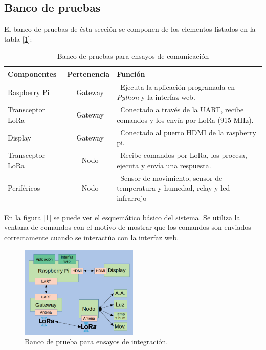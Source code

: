 \subsection{Banco de pruebas}

El banco de pruebas de ésta sección se componen de los elementos listados en la tabla [\ref{tab:bancodepruebas3}]:

\begin{table}[h]
	\centering
	\caption[Banco de pruebas 1]{Banco de pruebas para ensayos de comunicación}
	\begin{tabular}{l c m{7.5cm}}    
		\toprule
		\textbf{Componentes}  		& \textbf{Pertenencia}     	& \textbf{Función}																				\\
		\midrule
		Raspberry Pi				& \ Gateway 				& \ Ejecuta la aplicación programada en {\textit{Python}} y la interfaz web.	\\
		Transceptor LoRa 			& \ Gateway					& \ Conectado a través de la UART, recibe comandos y los envía por LoRa (915 MHz). 				\\
		Display	 					& \ Gateway 				& \ Conectado al puerto HDMI de la raspberry pi. 												\\
		Transceptor LoRa		 	& \ Nodo 					& \ Recibe comandos por LoRa, los procesa, ejecuta y envía una respuesta.						\\
		Periféricos		 			& \ Nodo 					& \ Sensor de movimiento, sensor de temperatura y humedad, relay y led infrarrojo				\\
		\bottomrule
		\hline
	\end{tabular}
	\label{tab:bancodepruebas3}
\end{table}

En la figura [\ref{fig:bancodepruebas3}] se puede ver el esquemático básico del sistema. Se utiliza la ventana de comandos con el motivo de mostrar que los comandos son enviados correctamente cuando se interactúa con la interfaz web. 

\begin{figure}[ht!]
	\centering
	\includegraphics[width=0.5\textwidth]{./Figures/bancodepruebas2.png}
	\caption{Banco de prueba para ensayos de integración.}
	\label{fig:bancodepruebas3}
\end{figure}


